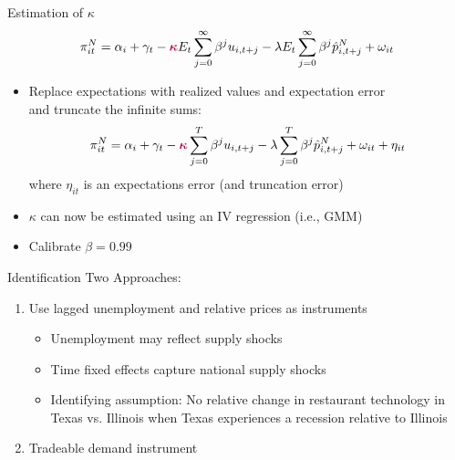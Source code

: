 \documentclass[10pt]{beamer}
\begin{document}
\begin{frame}{Estimation of $\kappa$}
	\[\pi_{it}^N = \alpha_i + \gamma _t - \textcolor{purple}{\boldsymbol{\kappa}} E_t \sum_{j=0}^{\infty} \beta^j u_{i,t+j} - \lambda E_t \sum_{j=0}^{\infty} \beta^j \hat{p}^N_{i,t+j} + \omega_{it} \] \vspace{-10pt}
	\begin{itemize}
		\itemsep1em 
		\item Replace expectations with realized values and expectation error \\ and truncate the infinite sums:
		\[\pi_{it}^N = \alpha_i + \gamma _t - \textcolor{purple}{\boldsymbol{\kappa}} \sum_{j=0}^{T} \beta^j u_{i,t+j} - \lambda \sum_{j=0}^{T} \beta^j \hat{p}^N_{i,t+j} + \omega_{it} + \eta_{it} \]
		where $\eta_{it}$ is an expectations error (and truncation error)
		\item $\kappa$ can now be estimated using an IV regression (i.e., GMM) \vspace{5pt}
		\item Calibrate $\beta = 0.99$
	\end{itemize}
\end{frame}


\begin{frame}{Identification} \label{identification}
	Two Approaches: \vspace{10pt}
	\begin{enumerate}
		\itemsep1em 
		\item Use lagged unemployment and relative prices as instruments
		\begin{itemize}
			\item Unemployment may reflect supply shocks
			\item Time fixed effects capture national supply shocks
			\item Identifying assumption: No relative change in restaurant technology in Texas vs. Illinois when Texas experiences a recession relative to Illinois
		\end{itemize}
		\item Tradeable demand instrument
	\end{enumerate}
\end{frame}
\end{document}
